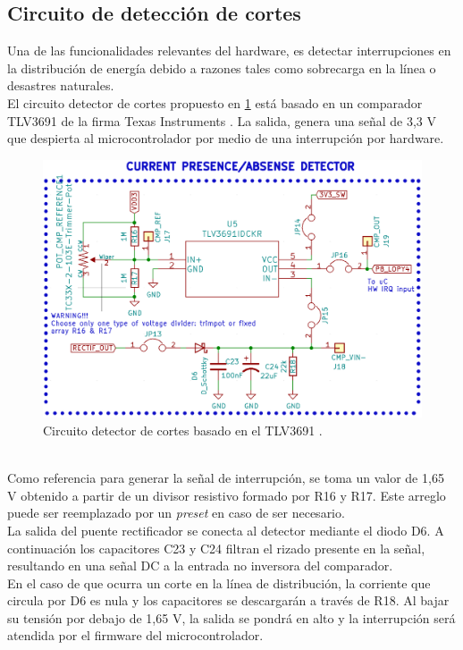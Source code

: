 \subsection{Circuito de detección de cortes}
 Una de las funcionalidades relevantes del hardware, es detectar interrupciones en la distribución de energía debido a razones tales como sobrecarga en la línea o desastres naturales.\\
 El circuito detector de cortes propuesto en \ref{fig:ctodetectorcortes} está basado en un comparador TLV3691 de la firma Texas Instruments \citep{tlv3691}. La salida, genera una señal de 3,3 V que despierta al microcontrolador por medio de una interrupci\'{o}n por hardware.\\
 \begin{figure}[h]
 	\centering
 	\includegraphics[width=0.9\linewidth]{Figures/cto_detector_cortes}
 	\caption{Circuito detector de cortes basado en el TLV3691 \citep{tlv3691}.}
 	\label{fig:ctodetectorcortes}
 \end{figure}\\
 Como referencia para generar la señal de interrupción, se toma un valor de 1,65 V obtenido a partir de un divisor resistivo formado por R16 y R17. Este arreglo puede ser reemplazado por un \textit{preset} en caso de ser necesario.\\
 La salida del puente rectificador se conecta al detector mediante el diodo D6. A continuación los capacitores C23 y C24 filtran el rizado presente en la señal, resultando en una señal DC a la entrada no inversora del comparador.\\
 En el caso de que ocurra un corte en la línea de distribución, la corriente que circula por D6 es nula y los capacitores se descargar\'{a}n a través de R18. Al bajar su tensión por debajo de 1,65 V, la salida se pondrá en alto y la interrupción será atendida por el firmware del microcontrolador.\\
 
